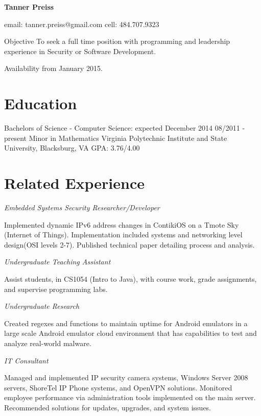 \documentclass{tpreiss_cv}
\begin{document}
\textbf{\Large{Tanner Preiss}}

email: tanner.preiss@gmail.com
cell: 484.707.9323

Objective   To seek a full time position with programming and leadership experience in Security or Software Development.

Availability from January 2015.

\section{Education}
Bachelors of Science - Computer Science: expected December 2014 	                                 08/2011 - present
	Minor in Mathematics
	Virginia Polytechnic Institute and State University, Blacksburg, VA
	GPA: 3.76/4.00     			

\section{Related Experience}
\textit{Embedded Systems Security Researcher/Developer}

Implemented dynamic IPv6 address changes in ContikiOS on a Tmote Sky (Internet of Things). Implementation included systems and networking level design(OSI levels 2-7). Published technical paper detailing process and analysis. 

\textit{Undergraduate Teaching Assistant}

Assist students, in CS1054 (Intro to Java), with course work, grade assignments, and supervise programming labs.

\textit{Undergraduate Research}

Created regexes and functions to maintain uptime for Android emulators in a large scale Android emulator cloud environment that has capabilities to test and analyze real-world malware.

\textit{IT Consultant}

Managed and implemented IP security camera systems, Windows Server 2008 servers, ShoreTel IP Phone systems, and OpenVPN solutions. Monitored employee performance via administration tools implemented on    the main server. Recommended solutions for updates, upgrades, and system issues.
\end{document}
